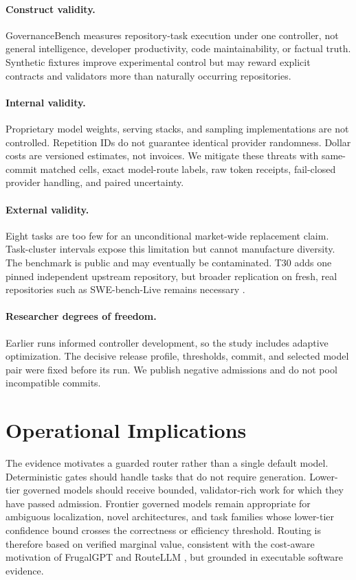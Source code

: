 \documentclass[10pt,twocolumn]{article}
\begin{document}
\paragraph{Construct validity.}
GovernanceBench measures repository-task execution under one controller, not
general intelligence, developer productivity, code maintainability, or factual
truth. Synthetic fixtures improve experimental control but may reward explicit
contracts and validators more than naturally occurring repositories.

\paragraph{Internal validity.}
Proprietary model weights, serving stacks, and sampling implementations are not
controlled. Repetition IDs do not guarantee identical provider randomness.
Dollar costs are versioned estimates, not invoices. We mitigate these threats
with same-commit matched cells, exact model-route labels, raw token receipts,
fail-closed provider handling, and paired uncertainty.

\paragraph{External validity.}
Eight tasks are too few for an unconditional market-wide replacement claim.
Task-cluster intervals expose this limitation but cannot manufacture diversity.
The benchmark is public and may eventually be contaminated. T30 adds one
pinned independent upstream repository, but broader replication on fresh,
real repositories such as SWE-bench-Live remains necessary
\citep{zhang2025swebenchlive}.

\paragraph{Researcher degrees of freedom.}
Earlier runs informed controller development, so the study includes adaptive
optimization. The decisive release profile, thresholds, commit, and selected
model pair were fixed before its run. We publish negative admissions and do
not pool incompatible commits.

\section{Operational Implications}

The evidence motivates a guarded router rather than a single default model.
Deterministic gates should handle tasks that do not require generation.
Lower-tier governed models should receive bounded, validator-rich work for
which they have passed admission. Frontier governed models remain appropriate
for ambiguous localization, novel architectures, and task families whose
lower-tier confidence bound crosses the correctness or efficiency threshold.
Routing is therefore based on verified marginal value, consistent with the
cost-aware motivation of FrugalGPT and RouteLLM
\citep{chen2023frugalgpt,ong2024routellm}, but grounded in executable software
evidence.
\end{document}
